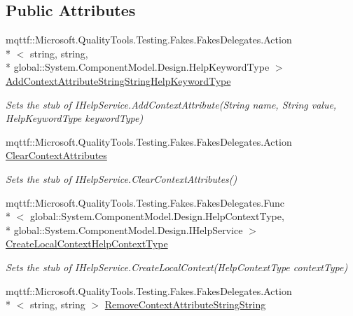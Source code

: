 \subsection*{Public Attributes}
\begin{DoxyCompactItemize}
\item 
mqttf\-::\-Microsoft.\-Quality\-Tools.\-Testing.\-Fakes.\-Fakes\-Delegates.\-Action\\*
$<$ string, string, \\*
global\-::\-System.\-Component\-Model.\-Design.\-Help\-Keyword\-Type $>$ \hyperlink{class_system_1_1_component_model_1_1_design_1_1_fakes_1_1_stub_i_help_service_a3a1a1465beecf1b1d476a9c899280b6d}{Add\-Context\-Attribute\-String\-String\-Help\-Keyword\-Type}
\begin{DoxyCompactList}\small\item\em Sets the stub of I\-Help\-Service.\-Add\-Context\-Attribute(\-String name, String value, Help\-Keyword\-Type keyword\-Type)\end{DoxyCompactList}\item 
mqttf\-::\-Microsoft.\-Quality\-Tools.\-Testing.\-Fakes.\-Fakes\-Delegates.\-Action \hyperlink{class_system_1_1_component_model_1_1_design_1_1_fakes_1_1_stub_i_help_service_aeaca689b19d8fefd497a63800169ace2}{Clear\-Context\-Attributes}
\begin{DoxyCompactList}\small\item\em Sets the stub of I\-Help\-Service.\-Clear\-Context\-Attributes()\end{DoxyCompactList}\item 
mqttf\-::\-Microsoft.\-Quality\-Tools.\-Testing.\-Fakes.\-Fakes\-Delegates.\-Func\\*
$<$ global\-::\-System.\-Component\-Model.\-Design.\-Help\-Context\-Type, \\*
global\-::\-System.\-Component\-Model.\-Design.\-I\-Help\-Service $>$ \hyperlink{class_system_1_1_component_model_1_1_design_1_1_fakes_1_1_stub_i_help_service_a14eee17473f15148a46d2ebca5de96c0}{Create\-Local\-Context\-Help\-Context\-Type}
\begin{DoxyCompactList}\small\item\em Sets the stub of I\-Help\-Service.\-Create\-Local\-Context(\-Help\-Context\-Type context\-Type)\end{DoxyCompactList}\item 
mqttf\-::\-Microsoft.\-Quality\-Tools.\-Testing.\-Fakes.\-Fakes\-Delegates.\-Action\\*
$<$ string, string $>$ \hyperlink{class_system_1_1_component_model_1_1_design_1_1_fakes_1_1_stub_i_help_service_a9a34b0380a6d89e126b7674e3b639ba6}{Remove\-Context\-Attribute\-String\-String}

\end{DoxyCompactItemize}
